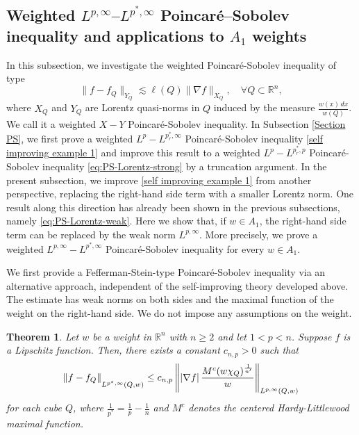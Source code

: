 \documentclass[reqno, 10pt, oneside]{amsart}
\numberwithin{equation}{section}
\newcommand{\strt}[1]{\rule{0pt}{#1}}
\newtheorem{theorem}{Theorem}
\numberwithin{theorem}{section}
\newcommand{\R}{{\mathbb R}}
\newcommand{\1}{{\rm 1\hspace*{-0.4ex}%
\rule{0.1ex}{1.52ex}\hspace*{0.2ex}}}
\begin{document}
\subsection{\texorpdfstring{Weighted $L^{p,\infty}$--$L^{p^*,\infty}$ Poincaré--Sobolev inequality and applications to $A_1$ weights}{Weighted Lp,infinity--Lp*,infinity Poincare-Sobolev inequality and applications to A1 weights}}\label{subsection weak}

In this subsection, we investigate the weighted Poincaré-Sobolev inequality of type
\begin{equation*}
    \|f-f_Q\|_{Y_Q} \lesssim \ell(Q) \|\nabla f\|_{X_Q}, \quad \forall Q \subset \R^n,
\end{equation*}
where $X_Q$ and $Y_Q$ are Lorentz quasi-norms in $Q$ induced by the measure $\frac{w(x)\,dx}{w(Q)}$. We call it a weighted $X-Y$ Poincaré-Sobolev inequality. In Subsection {\ref{Section PS}}, we first prove a weighted $L^p-L^{p_r^*,\infty}$ Poincaré-Sobolev inequality \eqref{self improving example 1} and improve this result to a weighted $L^p-L^{p_r^*,p}$ Poincaré-Sobolev inequality \eqref{eq:PS-Lorentz-strong} by a truncation argument. In the present subsection, we improve \eqref{self improving example 1} from another perspective, replacing the right-hand side term with a smaller Lorentz norm. One result along this direction has already been shown in the previous subsections, namely \eqref{eq:PS-Lorentz-weak}. Here we show that, if $w\in A_1$, the right-hand side term can be replaced by the weak norm $L^{p,\infty}$. More precisely, we prove a weighted $L^{p,\infty}-L^{p^*,\infty}$ Poincaré-Sobolev inequality for every $w\in A_1$.

We first provide a Fefferman-Stein-type Poincaré-Sobolev inequality via an alternative approach, independent of the self-improving theory developed above. The estimate has weak norms on both sides and the maximal function of the weight on the right-hand side. We do not impose any assumptions on the weight. 

\begin{theorem}\label{Thm PS 4}
    Let $w$ be a weight in $\R^n$ with $n\ge 2$ and let $1<p<n$. Suppose $f$ is a Lipschitz function. Then, there exists a constant $c_{n,p}>0$ such that
        \begin{equation}\label{Thm PS 4 Eq}
            \left\| f-f_Q\right\|_{ \strt{2.3ex} L^{p^*,\infty}(Q,w)} \le c_{n,p} \left\| \left| \nabla f \right| \frac{M^c(w\chi_Q)^\frac{1}{n'}}{w} \right\|_{\strt{2.3ex} L^{p,\infty}(Q,w)}
        \end{equation}
    for each cube $Q$, where $\frac{1}{p^*}=\frac{1}{p}-\frac{1}{n}$ and $M^c$ denotes the centered Hardy-Littlewood maximal function.
\end{theorem}
\end{document}
